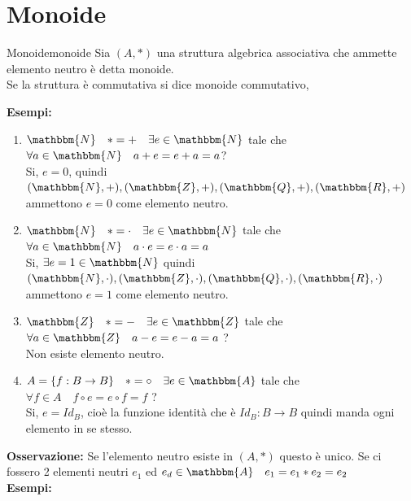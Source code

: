 \documentclass[12pt, letterpaper]{report}
\newcounter{definition}
\newcommand{\nmu}{}
\begin{document}
		\section{Monoide}
		\begin{definition}{\nmu Monoide}{monoide}
		Sia $(A, *)$ una struttura algebrica associativa che ammette elemento neutro è detta monoide. \\
		Se la struttura è commutativa si dice monoide commutativo,
		\end{definition}
		\textbf{Esempi:}
		\begin{enumerate}
			\item $\mathbbm{N} \quad *=+ \quad \exists e \in \mathbbm{N}$ tale che $\forall a \in \mathbbm{N} \quad a+e=e+a=a$? \\
			Si, $e=0$, quindi $(\mathbbm{N}, +), (\mathbbm{Z}, +), (\mathbbm{Q}, +), (\mathbbm{R}, +)$ ammettono $e=0$ come elemento neutro.
			\item $\mathbbm{N} \quad *=\cdot \quad \exists e \in \mathbbm{N}$ tale che $\forall a \in \mathbbm{N} \quad a\cdot e = e \cdot a = a$ \\
			Si, $\exists e=1 \in \mathbbm{N}$ quindi $(\mathbbm{N}, \cdot), (\mathbbm{Z}, \cdot), (\mathbbm{Q}, \cdot), (\mathbbm{R}, \cdot)$ ammettono $e=1$ come elemento neutro.
			\item $\mathbbm{Z} \quad *=- \quad \exists e \in \mathbbm{Z}$ tale che $\forall a \in \mathbbm{Z} \quad a-e=e-a=a$ ?\\
			Non esiste elemento neutro.
			\item $A = \{f: B \to B\} \quad *=\circ \quad \exists e \in \mathbbm{A} $ tale che $\forall f \in A \quad f \circ e = e \circ f = f$ ? \\
			Si, $e=Id_B$, cioè la funzione identità che è $Id_B: B \to B$ quindi manda ogni elemento in se stesso.
		\end{enumerate}
		\textbf{Osservazione:} Se l'elemento neutro esiste in $(A, *)$ questo è unico. Se ci fossero 2 elementi neutri $e_1$ ed $e_d \in \mathbbm{A} \quad e_1 = e_1 * e_2 = e_2$ \\
		\textbf{Esempi:}
\end{document}
